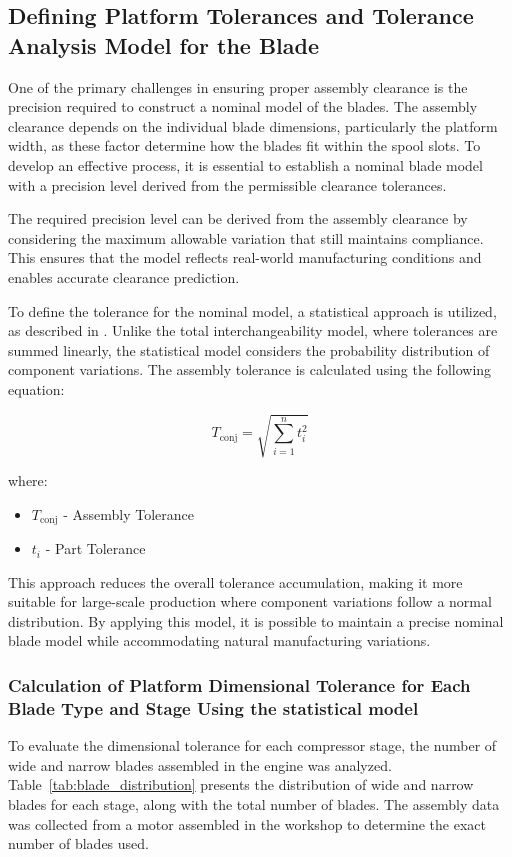\subsection{Defining Platform Tolerances and Tolerance Analysis Model for the Blade}
\label{subsec:desafios}

One of the primary challenges in ensuring proper assembly clearance is the precision required to construct a nominal model of the blades. The assembly clearance depends on the individual blade dimensions, particularly the platform width, as these factor determine how the blades fit within the spool slots. To develop an effective process, it is essential to establish a nominal blade model with a precision level derived from the permissible clearance tolerances.

The required precision level can be derived from the assembly clearance by considering the maximum allowable variation that still maintains compliance. This ensures that the model reflects real-world manufacturing conditions and enables accurate clearance prediction.

To define the tolerance for the nominal model, a statistical approach is utilized, as described in \cite{TSM}. Unlike the total interchangeability model, where tolerances are summed linearly, the statistical model considers the probability distribution of component variations. The assembly tolerance is calculated using the following equation:

\begin{equation}
    T_{\text{conj}} = \sqrt{\sum_{i=1}^{n} t_i^2}
    \label{eq:estat}
\end{equation}

where:
\begin{itemize}
\item $T_{\text{conj}}$ - Assembly Tolerance
\item $t_i$ - Part Tolerance
\end{itemize}

This approach reduces the overall tolerance accumulation, making it more suitable for large-scale production where component variations follow a normal distribution. By applying this model, it is possible to maintain a precise nominal blade model while accommodating natural manufacturing variations.

\subsubsection{Calculation of Platform Dimensional Tolerance for Each Blade Type and Stage Using the statistical model}
\label{subsubsec:clearance_calculation1}
To evaluate the dimensional tolerance for each compressor stage, the number of wide and narrow blades assembled in the engine was analyzed. Table~\ref{tab:blade_distribution} presents the distribution of wide and narrow blades for each stage, along with the total number of blades.
The assembly data was collected from a motor assembled in the workshop to determine the exact number of blades used.

